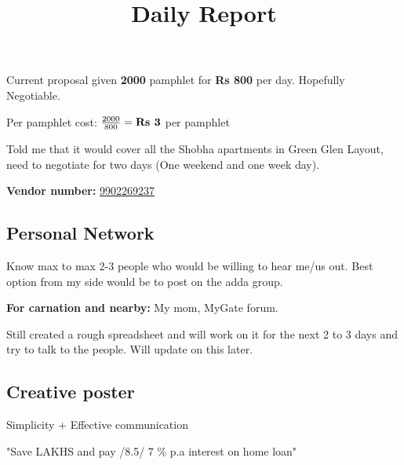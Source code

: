 \documentclass[12pt, a4paper]{article}
\begin{document}
\title{Daily Report}
\maketitle

\subsection{}

Current proposal given \textbf{2000} pamphlet for \textbf{Rs 800} per day. Hopefully Negotiable.

\vspace{0.5cm}

Per pamphlet cost: $\frac{2000}{800} = \textbf{Rs \the\numexpr 2000 / 800 \relax} $ per pamphlet

\bigskip

\noindent Told me that it would cover all the Shobha apartments in Green Glen Layout, need to negotiate for two days (One weekend and one week day).

\bigskip

\textbf{Vendor number:} \href{tel:+919902269237}{9902269237}

\subsection{Personal Network}

Know max to max 2-3 people who would be willing to hear me/us out. Best option from my side would be to post on the adda group.

\vspace{0.25cm}

\noindent \textbf{For carnation and nearby:} My mom, MyGate forum.

\vspace{0.25cm}

\noindent Still created a rough spreadsheet and will work on it for the next 2 to 3 days and try to talk to the people. Will update on this later.

\subsection{Creative poster}

Simplicity + Effective communication

\vspace{0.3cm}

"Save LAKHS and pay /8.5/ 7 \% p.a interest on home loan"
\end{document}

